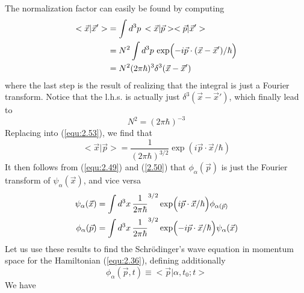 The normalization factor can easily be found by computing
\begin{align}
  <\vec{x}|\vec{x}'> &= \int d^3 p \, <\vec{x}|\vec{p}>
  <\vec{p}|\vec{x}'>\nonumber\\
  &= N^2 \int d^3 p\, \exp\Bigl(-i \vec{p}\cdot
  (\vec{x}-\vec{x}')/\hbar\Bigr) \nonumber\\
  &=
  N^2 (2\pi \hbar)^3 \delta^3(\vec{x}-\vec{x}')
  \label{equ:2.54}
\end{align}
where the last step is the result of realizing that the
integral is just a Fourier transform. Notice that the l.h.s.
is actually just $\delta^3(\vec{x}-\vec{x}')$, which finally
lead to
\begin{equation}
  N^2 = (2\pi\hbar)^{-3}
  \label{equ:2.55}
\end{equation}
Replacing into (\ref{equ:2.53}), we find that
\begin{equation}
  <\vec{x}|\vec{p}> = \frac{1}{(2\pi\hbar)^{3/2}} \exp(i
  \vec{p}\cdot \vec{x}/\hbar)
  \label{equ:2.56}
\end{equation}
It then follows from (\ref{equ:2.49}) and (\ref{2.50}) that
$\phi_{\alpha}(\vec{p})$ is just the Fourier transform of
$\psi_{\alpha}(\vec{x})$, and vice versa
\begin{align}
  \psi_{\alpha}(\vec{x}) &= \int d^3x \,
  \frac{1}{2\pi\hbar}^{3/2}
  \exp\Bigl(i\vec{p}\cdot\vec{x}/\hbar\Bigr)
  \phi_{\alpha(\vec{p})}\\
  \phi_{\alpha}(\vec{p}) &= \int d^3x \,
  \frac{1}{2\pi\hbar}^{3/2}
  \exp\Bigl(-i\vec{p}\cdot\vec{x}/\hbar\Bigr)
  \psi_{\alpha}(\vec{x})
\end{align}
Let us use these results to find the Schrödinger's wave
equation in momentum space for the Hamiltonian
(\ref{equ:2.36}), defining additionally
\begin{equation}
  \phi_{\alpha}(\vec{p},t) \equiv <\vec{p}|\alpha,t_0;t>
  \label{equ:2.58}
\end{equation}
We have
